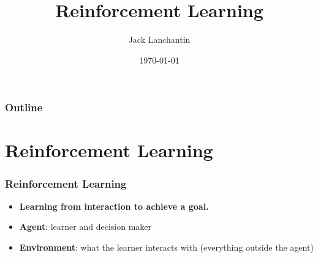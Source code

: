 \documentclass{beamer}
\title[Reinforcement Learning]{Reinforcement Learning} %
\author{Jack Lanchantin} %
\date{\today} %
\begin{document}
\begin{frame}
\titlepage %

\end{frame}

\begin{frame}
\frametitle{Outline} %
\tableofcontents %
\end{frame}

\section{Reinforcement Learning} %

\begin{frame}
\frametitle{Reinforcement Learning}
\begin{itemize}
\item \textbf{Learning from interaction to achieve a goal.}
\item \textbf{Agent}: learner and decision maker
\item \textbf{Environment}: what the learner interacts with (everything outside the agent)
\end{itemize}
\end{frame}

\end{document}
